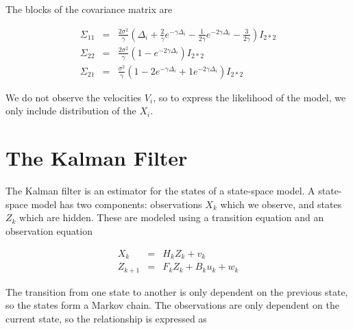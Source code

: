 The blocks of the covariance matrix are

$$
\begin{array}{lcl}
\Sigma_{11} &=& \frac{2\sigma^2}{\gamma}(\Delta_i + \frac{2}{\gamma} e^{-\gamma \Delta_i} - \frac{1}{2\gamma}e^{-2\gamma \Delta_i} - \frac{3}{2\gamma}) I_{2*2}
\\
\Sigma_{22} &=& \frac{2\sigma^2}{\gamma}(1-e^{-2\gamma \Delta_i}) I_{2*2}
\\
\Sigma_{21} &=& \frac{\sigma^2}{\gamma} (1 - 2e^{-\gamma \Delta_i} + 1 e^{-2\gamma \Delta_i})I_{2*2}
\end{array}
$$

We do not observe the velocities $V_i$, so to express the likelihood of the model, we only include distribution of the $X_i$.


\section{The Kalman Filter}
The Kalman filter is an estimator for the states of a state-space model. A state-space model has two components: observations $X_k$ which we observe, and states $Z_k$ which are hidden. These are modeled using a transition equation and an observation equation

$$
\begin{array}{lcl}
X_k &=& H_k Z_k + v_k
\\
Z_{k+1} &=& F_kZ_k + B_ku_k + w_k
\end{array}
$$

The transition from one state to another is only dependent on the previous state, so the states form a Markov chain. The observations are only dependent on the current state, so the relationship is expressed as




